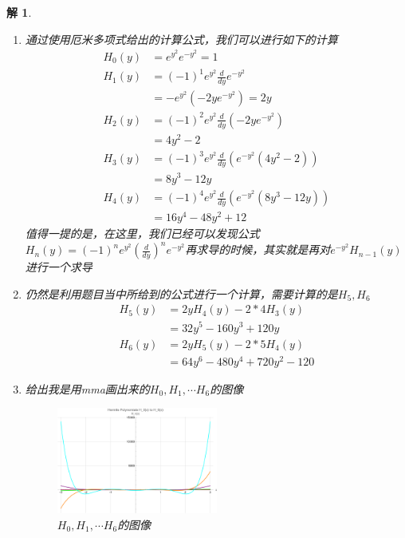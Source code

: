 \documentclass{article}
\newtheorem{solution}{解}
\begin{document}
\begin{solution}
    \begin{enumerate}
        \item[(1)] 通过使用厄米多项式给出的计算公式，我们可以进行如下的计算
        \begin{align*}
            H_0(y)&=e^{y^2}e^{-y^2}=1\\
            H_1(y)&=(-1)^1e^{y^2}\frac{d}{dy}e^{-y^2}\\
            &=-e^{y^2}(-2ye^{-y^2})=2y\\
            H_2(y)&=(-1)^2e^{y^2}\frac{d}{dy}\left(-2ye^{-y^2}\right)\\
            &=4y^2-2\\
            H_3(y)&=(-1)^3e^{y^2}\frac{d}{dy}\left(e^{-y^2}(4y^2-2)\right)\\
            &=8y^3-12y\\
            H_4(y)&=(-1)^4e^{y^2}\frac{d}{dy}\left(e^{-y^2}(8y^3-12y)\right)\\
            &=16y^4-48y^2+12
        \end{align*}
        值得一提的是，在这里，我们已经可以发现公式$\displaystyle H_n(y)=(-1)^n e^{y^2}\left(\frac{d}{dy}\right)^n e^{-y^2}$再求导的时候，其实就是再对$e^{-y^2}H_{n-1}(y)$进行一个求导
        \item[(2)] 仍然是利用题目当中所给到的公式进行一个计算，需要计算的是$H_5,H_6$
        \begin{align*}
            H_5(y)&=2yH_4(y)-2*4H_3(y)\\
            &=32y^5-160y^3+120y\\
            H_6(y)&=2yH_5(y)-2*5H_4(y)\\
            &=64y^6-480y^4+720y^2-120
        \end{align*}
        \item[(3)] 给出我是用mma画出来的$H_0,H_1,\cdots H_6$的图像
        \begin{figure}[hbtp]
            \centering
            \includegraphics[width=0.5\textwidth]{figure/厄米多项式.png}
            \caption{$H_0,H_1,\cdots H_6$的图像}
        \end{figure}
        

\end{enumerate}
\end{solution}
\end{document}
